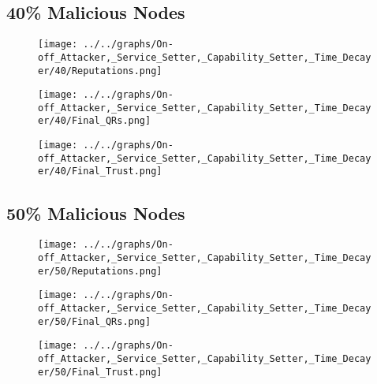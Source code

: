 \begin{minipage}[t]{0.49\columnwidth}
\subsection*{40\% Malicious Nodes}
    \begin{figure}[H]
        \centering
        \texttt{[image: ../../graphs/On-off\_Attacker,\_Service\_Setter,\_Capability\_Setter,\_Time\_Decayer/40/Reputations.png]}
    \end{figure}
    \begin{figure}[H]
        \centering
        \texttt{[image: ../../graphs/On-off\_Attacker,\_Service\_Setter,\_Capability\_Setter,\_Time\_Decayer/40/Final\_QRs.png]}
    \end{figure}
\end{minipage}
\begin{minipage}[t]{0.49\columnwidth}
    \begin{figure}[H]
        \centering
        \texttt{[image: ../../graphs/On-off\_Attacker,\_Service\_Setter,\_Capability\_Setter,\_Time\_Decayer/40/Final\_Trust.png]}
    \end{figure}
\end{minipage}

\begin{minipage}[t]{0.49\columnwidth}
\subsection*{50\% Malicious Nodes}
    \begin{figure}[H]
        \centering
        \texttt{[image: ../../graphs/On-off\_Attacker,\_Service\_Setter,\_Capability\_Setter,\_Time\_Decayer/50/Reputations.png]}
    \end{figure}
    \begin{figure}[H]
        \centering
        \texttt{[image: ../../graphs/On-off\_Attacker,\_Service\_Setter,\_Capability\_Setter,\_Time\_Decayer/50/Final\_QRs.png]}
    \end{figure}
\end{minipage}
\begin{minipage}[t]{0.49\columnwidth}
    \begin{figure}[H]
        \centering
        \texttt{[image: ../../graphs/On-off\_Attacker,\_Service\_Setter,\_Capability\_Setter,\_Time\_Decayer/50/Final\_Trust.png]}
    \end{figure}
\end{minipage}


